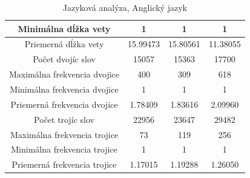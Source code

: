 \begin{table}[]
\begin{tabular}{|c|c|c|c|}
Minimálna dĺžka vety & 1 & 1 & 1 \\ \hline
Priemerná dĺžka vety & 15.99473 & 15.80561 & 11.38055 \\ \hline
Počet dvojíc slov & 15057 & 15363 & 17700 \\ \hline
Maximálna frekvencia dvojice & 400 & 309 & 618 \\ \hline
Minimálna frekvencia dvojice & 1 & 1 & 1 \\ \hline
Priemerná frekvencia dvojice & 1.78409 & 1.83616 & 2.09960 \\ \hline
Počet trojíc slov & 22956 & 23647 & 29482 \\ \hline
Maximálna frekvencia trojice & 73 & 119 & 256 \\ \hline
Minimálna frekvencia trojice & 1 & 1 & 1 \\ \hline
Priemerná frekvencia trojice & 1.17015 & 1.19288 & 1.26050 \\ \hline
\end{tabular}
\caption{Jazyková analýza, Anglický jazyk}\label{tab:anglickyJazykovaAnalyza}
\end{table}


